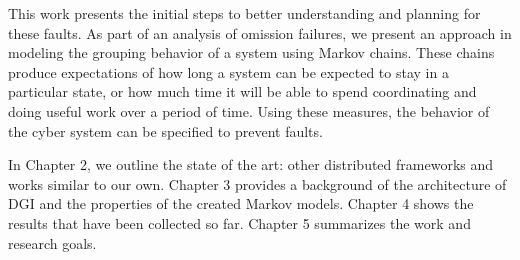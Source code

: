 This work presents the initial steps to better understanding and planning for these faults.
As part of an analysis of omission failures, we present an approach in modeling the grouping behavior of a system using Markov chains.
These chains produce expectations of how long a system can be expected to stay in a particular state, or how much time it will be able to spend coordinating and doing useful work over a period of time.
Using these measures, the behavior of the cyber system can be specified to prevent faults.

In Chapter 2, we outline the state of the art: other distributed frameworks and works similar to our own.
Chapter 3 provides a background of the architecture of DGI and the properties of the created Markov models.
Chapter 4 shows the results that have been collected so far.
Chapter 5 summarizes the work and research goals.
